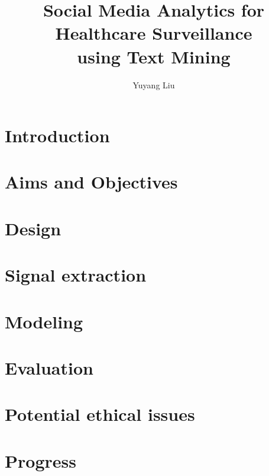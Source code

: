 \documentclass[12pt]{report}
\begin{document}
\title{Social Media Analytics for Healthcare Surveillance \\using Text Mining}
\author{Yuyang Liu}
\normallinespacing
\maketitle

\tableofcontents %
\body
\chapter{Introduction} %

 
\chapter{Aims and Objectives}

 
\chapter{Design}


\chapter{Signal extraction}


\chapter{Modeling}

\chapter{Evaluation}


\chapter{Potential ethical issues}


\chapter{Progress}




\end{document}
